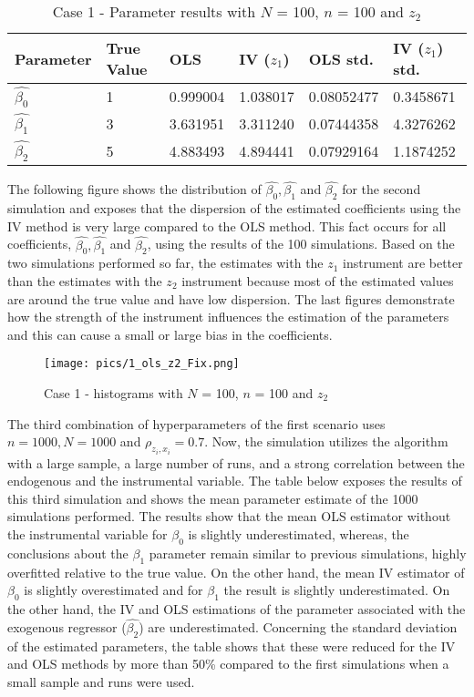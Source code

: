 \documentclass{article}
\begin{document}
\newline
\begin{table}[h!]
\centering
\begin{tabular}{ | m{2cm} | m{2cm}|  m{2cm}| m{2cm}|  m{2cm}| m{2cm}|} 
  \hline
  Parameter & True Value & OLS & IV ($z_{1}$) & OLS std. & IV ($z_{1}$) std.\\ 
  \hline
  $\hat{\beta_{0}}$ & 1 & 0.999004 & 1.038017 & 0.08052477 & 0.3458671\\ 
  \hline
  $\hat{\beta_{1}}$ & 3 & 3.631951 & 3.311240 & 0.07444358 & 4.3276262 \\
  \hline
  $\hat{\beta_{2}}$ & 5 & 4.883493 & 4.894441 & 0.07929164 & 1.1874252 \\
  \hline
\end{tabular}
\caption{Case 1 - Parameter results with $N$ = 100, $n$ = 100 and $z_{2}$}
\label{table:2}
\end{table}
\newline
The following figure shows the distribution of $\hat{\beta_{0}}, \hat{\beta_{1}}$ and $\hat{\beta_{2}}$ for the second simulation and exposes that the dispersion of the estimated coefficients using the IV method is very large compared to the OLS method. This fact occurs for all coefficients, $\hat{\beta_{0}}, \hat{\beta_{1}}$ and $\hat{\beta_{2}}$, using the results of the 100 simulations. Based on the two simulations performed so far, the estimates with the $z_{1}$ instrument are better than the estimates with the $z_{2}$ instrument because most of the estimated values are around the true value and have low dispersion. The last figures demonstrate how the strength of the instrument influences the estimation of the parameters and this can cause a small or large bias in the coefficients.
\begin{figure}[h]
\centering
\texttt{[image: pics/1\_ols\_z2\_Fix.png]}
\caption{Case 1 - histograms with $N$ = 100, $n$ = 100 and $z_{2}$}
\label{fig:image2}
\end{figure}
\newline
The third combination of hyperparameters of the first scenario uses $n = 1000, N = 1000$ and $\rho_{z_{i},x_{i}} = 0.7$. Now, the simulation utilizes the algorithm with a large sample, a large number of runs, and a strong correlation between the endogenous and the instrumental variable. 
\newline
The table below exposes the results of this third simulation and shows the mean parameter estimate of the 1000 simulations performed. The results show that the mean OLS estimator without the instrumental variable for $\beta_{0}$ is slightly underestimated, whereas, the conclusions about the $\beta_{1}$ parameter remain similar to previous simulations, highly overfitted relative to the true value. On the other hand, the mean IV estimator of $\beta_{0}$ is slightly overestimated and for $\beta_{1}$ the result is slightly underestimated. On the other hand, the IV and OLS estimations of the parameter associated with the exogenous regressor ($\hat{\beta_{2}}$) are underestimated. Concerning the standard deviation of the estimated parameters, the table shows that these were reduced for the IV and OLS methods by more than 50\% compared to the first simulations when a small sample and runs were used.
\end{document}
